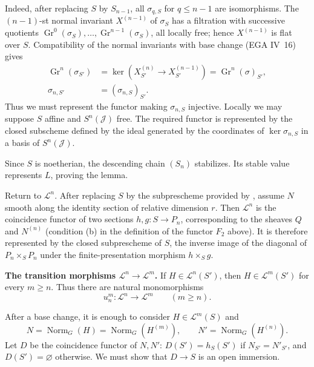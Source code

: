 Indeed, after replacing \(S\) by \(S_{n-1}\), all
\(\sigma_{q,S}\) for \(q\leq n-1\) are isomorphisms. The
\((n-1)\)-st normal invariant \(X^{(n-1)}\) of \(\sigma_S\) has a
filtration with successive quotients
 \(\operatorname{Gr}^0(\sigma_S),\ldots,
 \operatorname{Gr}^{n-1}(\sigma_S)\), all locally free; hence
\(X^{(n-1)}\) is flat over \(S\). Compatibility of the normal
invariants with base change (EGA IV~16) gives
\[
\begin{aligned}
\operatorname{Gr}^n(\sigma_{S'})
 &=\ker\!\left(X_{S'}^{(n)}\to X_{S'}^{(n-1)}\right)
  =\operatorname{Gr}^n(\sigma)_{S'},\\
\sigma_{n,S'}&=(\sigma_{n,S})_{S'}.
\end{aligned}
\]
Thus we must represent the functor making \(\sigma_{n,S}\) injective.
Locally we may suppose \(S\) affine and \(S^n(\mathcal J)\) free.
The required functor is represented by the closed subscheme defined
by the ideal generated by the coordinates of
\(\ker\sigma_{n,S}\) in a basis of \(S^n(\mathcal J)\).

Since \(S\) is noetherian, the descending chain \((S_n)\) stabilizes.
Its stable value represents \(L\), proving the lemma.

Return to \(\mathcal L^n\). After replacing \(S\) by the subprescheme
provided by , assume \(N\) smooth along the identity section
of relative dimension \(r\). Then \(\mathcal L^n\) is the coincidence
functor of two sections \(h,g:S\to P_n\), corresponding to the sheaves \(Q\) and
\(N^{(n)}\) (condition (b) in the definition of the functor \(F_2\) above). It is therefore represented by the closed subprescheme of \(S\), the inverse image of the
diagonal of \(P_n\times_SP_n\) under the finite-presentation morphism
\(h\times_Sg\).

\medskip\noindent
\textbf{The transition morphisms
\(\mathcal L^n\to\mathcal L^m\).}
If \(H\in\mathcal L^n(S')\), then \(H\in\mathcal L^m(S')\) for every
\(m\geq n\). Thus there are natural monomorphisms
\[
  u_n^m:\mathcal L^n\longrightarrow\mathcal L^m
  \qquad(m\geq n).
\]


After a base change, it is enough to consider \(H\in\mathcal L^m(S)\)
and
\[
 N=\operatorname{Norm}_G(H)=\operatorname{Norm}_G(H^{(m)}),
 \qquad
 N'=\operatorname{Norm}_G(H^{(n)}).
\]
Let \(D\) be the coincidence functor of \(N,N'\): \(D(S')=h_S(S')\)
if \(N_{S'}=N'_{S'}\), and \(D(S')=\varnothing\) otherwise. We must
show that \(D\to S\) is an open immersion.

